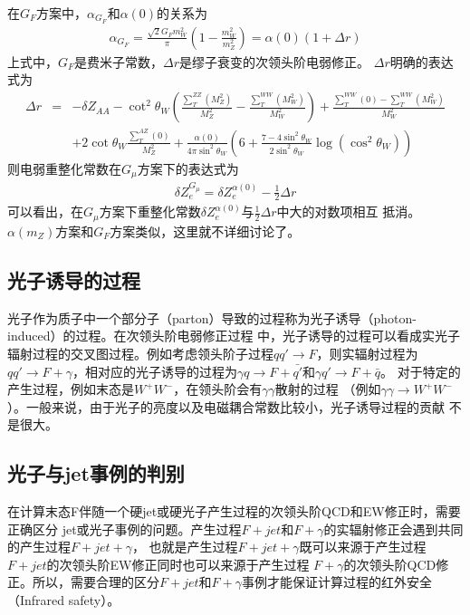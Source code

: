 在$G_F$方案中，$\alpha_{G_F}$和$\alpha(0)$的关系为
\begin{eqnarray}
\alpha_{G_F} = \frac{\sqrt{2}G_F m^2_W}{\pi} \left(1-\frac{m^2_W}{m^2_Z}\right)
= \alpha(0)(1+\Delta r)
\label{eqn:Gmu}
\end{eqnarray}
上式中，$G_F$是费米子常数，$\Delta r$是缪子衰变的次领头阶电弱修正。
$\Delta r$明确的表达式为\cite{muondecay}
\begin{eqnarray}
\Delta r
&=&
-\delta Z_{AA}
- \cot^2\theta_W \left( \frac{\sum^{ZZ}_T(M^2_Z)}{M^2_Z} - \frac{\sum^{WW}_T(M^2_W)}{M^2_W} \right)
+ \frac{\sum^{WW}_T(0)-\sum^{WW}_T(M^2_W)}{M^2_W} \nonumber \\
&& + 2 \cot\theta_W \frac{\sum^{AZ}_T(0)}{M^2_Z}
+ \frac{\alpha(0)}{4\pi \sin^2\theta_W} \left( 6 + \frac{7 -4 \sin^2\theta_W}{2 \sin^2\theta_W} \log(\cos^2\theta_W) \right)
\label{eqn:deltar}
\end{eqnarray}
则电弱重整化常数在$G_{\mu}$方案下的表达式为
\begin{eqnarray}
\delta Z^{G_{\mu}}_e = \delta Z^{\alpha(0)}_e - \frac{1}{2}\Delta r
\end{eqnarray}
可以看出，在$G_{\mu}$方案下重整化常数$\delta Z^{\alpha(0)}_e$与$\frac{1}{2}\Delta r$中大的对数项相互
抵消。$\alpha(m_Z)$方案和$G_F$方案类似，这里就不详细讨论了。


\subsection{光子诱导的过程}
光子作为质子中一个部分子（parton）导致的过程称为光子诱导（photon-induced）的过程。在次领头阶电弱修正过程
中，光子诱导的过程可以看成实光子辐射过程的交叉图过程。例如考虑领头阶子过程$qq'\to F$，则实辐射过程为
$qq'\to F+\gamma$，相对应的光子诱导的过程为$\gamma q \to F+\bar{q'}$和$\gamma q' \to F+\bar{q}$。
对于特定的产生过程，例如末态是$W^+W^-$，在领头阶会有$\gamma\gamma$散射的过程
（例如$\gamma\gamma\to W^+W^-$）。一般来说，由于光子的亮度以及电磁耦合常数比较小，光子诱导过程的贡献
不是很大。


\subsection{光子与jet事例的判别}
\label{sec:photon_jet_event}
在计算末态F伴随一个硬jet或硬光子产生过程的次领头阶QCD和EW修正时，需要正确区分
jet或光子事例的问题。产生过程$F+jet$和$F+\gamma$的实辐射修正会遇到共同的产生过程$F+jet+\gamma$，
也就是产生过程$F+jet+\gamma$既可以来源于产生过程$F+jet$的次领头阶EW修正同时也可以来源于产生过程
$F+\gamma$的次领头阶QCD修正。所以，需要合理的区分$F+jet$和$F+\gamma$事例才能保证计算过程的红外安全
（Infrared safety）。

